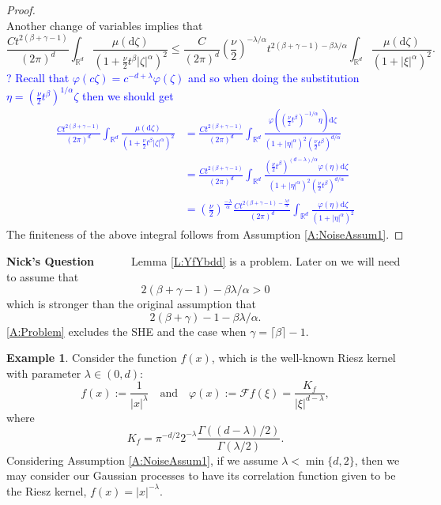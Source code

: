 \documentclass[a4paper,11pt]{article}
\numberwithin{equation}{section}
\theoremstyle{plain}
\theoremstyle{definition}
\newtheorem{example}[theorem]{Example}
\newcommand{\ud}{\ensuremath{\mathrm{d} }}
\newcommand{\R}{\mathbb{R}}
\newcounter{NQ}
\newenvironment{NickQuestion}[1][] %
{\refstepcounter{NQ}
	\begin{mdframed}[backgroundcolor=lightgray]\textbf{Nick's Question \theNQ \: #1~~}~~~\noindent}%
	{\end{mdframed}}
\numberwithin{NQ}{section}
\numberwithin{LQ}{section}
\numberwithin{ZQ}{section}
\begin{document}
\begin{proof}
\[ 	\]
 Another change of variables implies that 
  	\[
  	\frac{C  t^{2(\beta + \gamma -1)}}{ (2\pi)^d } \int_{\R^{d}}  \frac{ \mu(\ud \zeta) }{\left(1+ \frac{\nu}{2} t^\beta |\zeta|^\alpha \right)^2 }  \le 
  	\frac{C }{ (2\pi)^d } \left(\frac{\nu}{2}\right)^{-\lambda/\alpha}  t^{2(\beta + \gamma -1)-\beta \lambda/\alpha} \int_{\R^{d}}  \frac{ \mu(\ud \zeta) }{\left(1+ |\xi|^\alpha\right)^2 } .
  	\]
  \textcolor{blue}{? Recall that $\varphi(c \zeta) = c^{-d+\lambda}\varphi(\zeta)$ and so when doing the substitution $\eta = \left(\frac{\nu}{2}t^{\beta} \right)^{1/\alpha} \zeta$ then we should get 
  		\begin{align*}
  			\frac{C  t^{2(\beta + \gamma -1)}}{ (2\pi)^d } \int_{\R^{d}}  \frac{ \mu(\ud \zeta) }{\left(1+ \frac{\nu}{2} t^\beta |\zeta|^\alpha \right)^2 } &= \frac{C  t^{2(\beta + \gamma -1)}}{ (2\pi)^d } \int_{\R^{d}}  \frac{ \varphi\left( \left(\frac{\nu}{2}t^{\beta} \right)^{-1/\alpha}\eta\right)\ud \zeta }{\left(1+  \left|\eta \right|^\alpha \right)^2 \left(\frac{\nu}{2}t^{\beta} \right)^{d/\alpha} } \\
  			&= \frac{C  t^{2(\beta + \gamma -1)}}{ (2\pi)^d } \int_{\R^{d}}  \frac{ \left(\frac{\nu}{2}t^{\beta} \right)^{(d-\lambda)/\alpha} \varphi\left( \eta\right)\ud \zeta }{\left(1+  \left|\eta \right|^\alpha \right)^2 \left(\frac{\nu}{2}t^{\beta} \right)^{d/\alpha} } \\
  			&=\left(\frac{\nu}{2}\right)^{\frac{-\lambda }{\alpha}}\frac{C  t^{2(\beta + \gamma -1)-\frac{\lambda \beta}{\alpha}}}{ (2\pi)^d } \int_{\R^{d}}  \frac{ \varphi\left( \eta\right)\ud \zeta }{\left(1+  \left|\eta \right|^\alpha \right)^2 } 
  		\end{align*}
   }
The finiteness of the above integral follows from Assumption \ref{A:NoiseAssum1}.
  \end{proof}	
  	
  \begin{NickQuestion}
 Lemma \ref{L:YfYbdd} is a problem. Later on we will need to assume that 
 	\begin{equation}
 	\label{A:Problem}
 		2(\beta + \gamma -1)-\beta \lambda/\alpha > 0
 	\end{equation}
 which is stronger than the original assumption that 
 	\[
 		2(\beta + \gamma) -1 -\beta \lambda/\alpha.
 	\]
 \eqref{A:Problem} excludes the SHE and the case when $\gamma = \lceil \beta \rceil -1$. 
  \end{NickQuestion}	
  	
	\begin{example}
	\label{E:RieszKernel}
Consider the function $f(x)$, which is the well-known Riesz kernel with parameter $\lambda \in (0,d)$:
		\[
			f(x) := \frac{1}{|x|^\lambda} \quad \text{and} \quad \varphi(x):= \mathcal{F}f(\xi) = \frac{K_f}{|\xi|^{d-\lambda}},
		\]
	where
		\[
			K_f     = \pi^{-d/2}2^{-\lambda} \frac{\Gamma((d-\lambda)/2)}{\Gamma(\lambda/2)}.
		\]
Considering Assumption \ref{A:NoiseAssum1}, if we assume $\lambda < \min\{d,2\}$, then we may consider our Gaussian processes to have its correlation function given to be the Riesz kernel, $f(x)=|x|^{-\lambda}$. 
	\end{example} 
\end{document}
